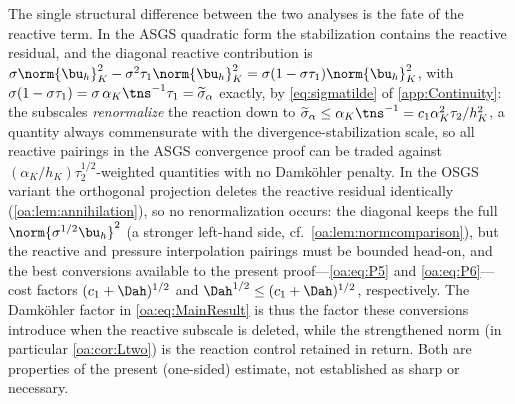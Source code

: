 \begin{remark}
\label{oa:rem:mechanism}
The single structural difference between the two analyses is the fate of the reactive
term. In the ASGS quadratic form the stabilization contains the reactive residual, and
the diagonal reactive contribution is
$\sigma\norm{\bu_h}_K^2 - \sigma^2\tau_{1}\norm{\bu_h}_K^2
= \sigma(1-\sigma\tau_1)\norm{\bu_h}_K^2$, with
$\sigma(1-\sigma\tau_1) = \sigma\,\alpha_K\tns^{-1}\tau_1 =
\widetilde{\sigma}_\alpha$ exactly, by \cref{eq:sigmatilde} of \cref{app:Continuity}: the subscales \emph{renormalize} the reaction down to
$\widetilde{\sigma}_\alpha \le \alpha_K\tns^{-1} = c_1\alpha_K^2\tau_2/h_K^2$, a
quantity always commensurate with the divergence-stabilization scale, so all reactive
pairings in the ASGS convergence proof can be traded against
$(\alpha_K/h_K)\tau_2^{1/2}$-weighted quantities with no Damk\"ohler penalty. In the
OSGS variant the orthogonal projection deletes the reactive residual identically
(\cref{oa:lem:annihilation}), so no renormalization occurs: the diagonal keeps the full
$\norm{\sigma^{1/2}\bu_h}^2$ (a stronger left-hand side, cf.\
\cref{oa:lem:normcomparison}), but the reactive and pressure interpolation pairings must
be bounded head-on, and the best conversions available to the present proof---\cref{oa:eq:P5}
and \cref{oa:eq:P6}---cost factors $(c_1+\Dah)^{1/2}$ and $\Dah^{1/2}\le(c_1+\Dah)^{1/2}$, respectively. The Damk\"ohler factor in
\cref{oa:eq:MainResult} is thus the factor these conversions introduce when the reactive
subscale is deleted, while the strengthened norm (in particular \cref{oa:cor:Ltwo}) is the
reaction control retained in return. Both are properties of the present (one-sided)
estimate, not established as sharp or necessary.
\end{remark}

